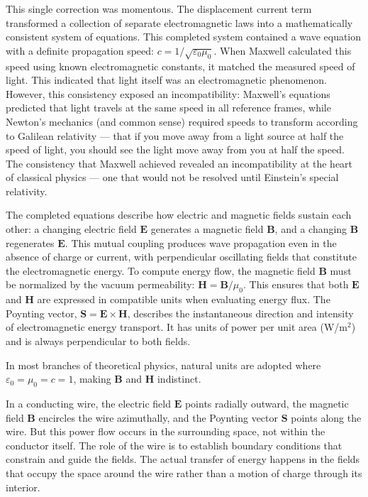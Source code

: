 This single correction was momentous. The displacement current term transformed a collection of separate electromagnetic laws into a mathematically consistent system of equations. This completed system contained a wave equation with a definite propagation speed: $c = 1/\sqrt{\varepsilon_0 \mu_0}$. When Maxwell calculated this speed using known electromagnetic constants, it matched the measured speed of light. This indicated that light itself was an electromagnetic phenomenon. However, this consistency exposed an incompatibility: Maxwell's equations predicted that light travels at the same speed in all reference frames, while Newton's mechanics (and common sense) required speeds to transform according to Galilean relativity — that if you move away from a light source at half the speed of light, you should see the light move away from you at half the speed. The consistency that Maxwell achieved revealed an incompatibility at the heart of classical physics — one that would not be resolved until Einstein's special relativity.

The completed equations describe how electric and magnetic fields sustain each other: a changing electric field $\mathbf{E}$ generates a magnetic field $\mathbf{B}$, and a changing $\mathbf{B}$ regenerates $\mathbf{E}$. This mutual coupling produces wave propagation even in the absence of charge or current, with perpendicular oscillating fields that constitute the electromagnetic energy. To compute energy flow, the magnetic field $\mathbf{B}$ must be normalized by the vacuum permeability: $\mathbf{H} = \mathbf{B} / \mu_0$. This ensures that both $\mathbf{E}$ and $\mathbf{H}$ are expressed in compatible units when evaluating energy flux. The Poynting vector, $\mathbf{S} = \mathbf{E} \times \mathbf{H}$, describes the instantaneous direction and intensity of electromagnetic energy transport. It has units of power per unit area (W/m$^2$) and is always perpendicular to both fields.

In most branches of theoretical physics, natural units are adopted where $\varepsilon_0 = \mu_0 = c = 1$, making $\mathbf{B}$ and $\mathbf{H}$ indistinct.

In a conducting wire, the electric field $\mathbf{E}$ points radially outward, the magnetic field $\mathbf{B}$ encircles the wire azimuthally, and the Poynting vector $\mathbf{S}$ points along the wire. But this power flow occurs in the surrounding space, not within the conductor itself. The role of the wire is to establish boundary conditions that constrain and guide the fields. The actual transfer of energy happens in the fields that occupy the space around the wire rather than a motion of charge through its interior.

